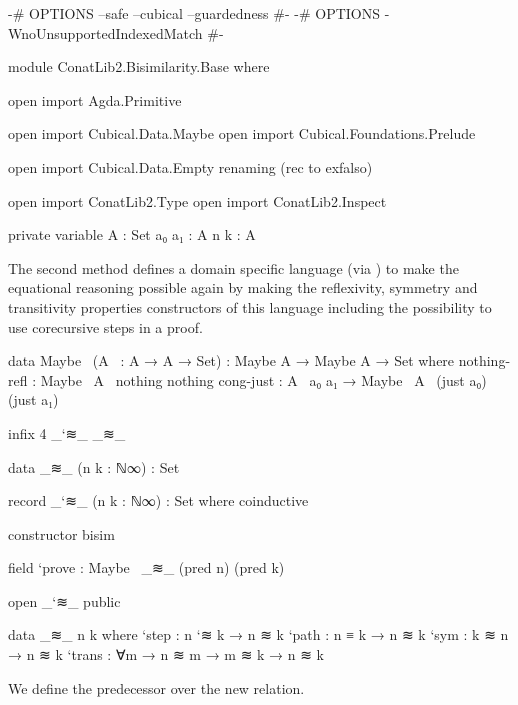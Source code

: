 \begin{code}[hide]
{-# OPTIONS --safe --cubical --guardedness #-}
{-# OPTIONS -WnoUnsupportedIndexedMatch #-}

module ConatLib2.Bisimilarity.Base where

open import Agda.Primitive

open import Cubical.Data.Maybe
open import Cubical.Foundations.Prelude

open import Cubical.Data.Empty
  renaming (rec to exfalso)

open import ConatLib2.Type
open import ConatLib2.Inspect

private variable
  A : Set
  a₀ a₁ : A
  n k : A
\end{code}

The second method defines a domain specific language (via \cite{danielsson-beating}) to make
the equational reasoning possible again by making the reflexivity, symmetry and
transitivity properties constructors of this language including the possibility
to use corecursive steps in a proof.

\begin{code}
data Maybe~ (A~ : A → A → Set) :
  Maybe A → Maybe A → Set
  where
    nothing-refl : Maybe~ A~ nothing nothing
    cong-just : A~ a₀ a₁ → Maybe~ A~ (just a₀) (just a₁)
\end{code}
\begin{code}[hide]
infix 4 _`≋_ _≋_
\end{code}
\begin{code}
data _≋_ (n k : ℕ∞) : Set

record _`≋_ (n k : ℕ∞) : Set where
  coinductive
\end{code}
\begin{code}[hide]
  constructor bisim
\end{code}
\begin{code}
  field
    `prove : Maybe~ _≋_ (pred n) (pred k)
\end{code}
\begin{code}[hide]
open _`≋_ public
\end{code}
\begin{code}
data _≋_ n k where
  `step  : n `≋ k → n ≋ k
  `path  : n ≡ k → n ≋ k
  `sym   : k ≋ n → n ≋ k
  `trans : ∀{m} → n ≋ m → m ≋ k → n ≋ k
\end{code}

We define the predecessor over the new  relation.

